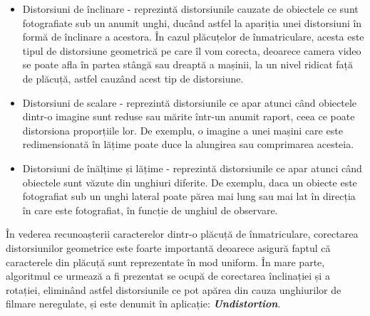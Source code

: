 \documentclass[12pt]{article}
\begin{document}
\begin{itemize}
    \item Distorsiuni de \^{i}nclinare - reprezint\u{a} distorsiunile cauzate de obiectele ce sunt fotografiate sub un anumit unghi, duc\^{a}nd astfel la apariția unei distorsiuni \^{i}n form\u{a} de \^{i}nclinare a acestora. \^{I}n cazul pl\u{a}cuțelor de \^{i}nmatriculare, acesta este tipul de distorsiune geometric\u{a} pe care \^{i}l vom corecta, deoarece camera video se poate afla \^{i}n partea st\^{a}ng\u{a} sau dreapt\u{a} a mașinii, la un nivel ridicat faț\u{a} de pl\u{a}cuț\u{a}, astfel cauz\^{a}nd acest tip de distorsiune.
    \item Distorsiuni de scalare - reprezint\u{a} distorsiunile ce apar atunci c\^{a}nd obiectele dintr-o imagine sunt reduse sau m\u{a}rite \^{i}ntr-un anumit raport, ceea ce poate distorsiona proporțiile lor. De exemplu, o imagine a unei mașini care este redimensionat\u{a} \^{i}n l\u{a}țime poate duce la alungirea sau comprimarea acesteia.
    \item Distorsiuni de \^{i}n\u{a}lțime și l\u{a}țime - reprezint\u{a} distorsiunile ce apar atunci c\^{a}nd obiectele sunt v\u{a}zute din unghiuri diferite. De exemplu, daca un obiecte este fotografiat sub un unghi lateral poate p\u{a}rea mai lung sau mai lat \^{i}n direcția \^{i}n care este fotografiat, \^{i}n funcție de unghiul de observare.
\end{itemize}

\^{I}n vederea recunoașterii caracterelor dintr-o pl\u{a}cuț\u{a} de \^{i}nmatriculare, corectarea distorsiunilor geometrice este foarte important\u{a} deoarece asigur\u{a} faptul c\u{a} caracterele din pl\u{a}cuț\u{a} sunt reprezentate \^{i}n mod uniform. \^{I}n mare parte, algoritmul ce urmeaz\u{a} a fi prezentat se ocup\u{a} de corectarea \^{i}nclinației și a rotației, elimin\^{a}nd astfel distorsiunile ce pot ap\u{a}rea din cauza unghiurilor de filmare neregulate, și este denumit \^{i}n aplicație: \textbf{\textit{Undistortion}}.
\end{document}
